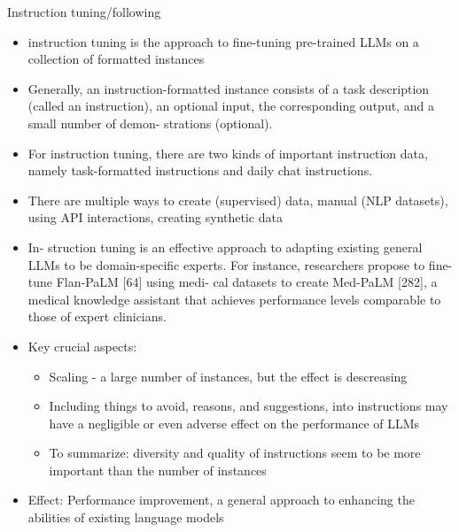 \documentclass[10pt]{beamer}
\begin{document}
\begin{frame}{Instruction tuning/following}

\begin{itemize}
\item instruction tuning is the approach to fine-tuning pre-trained LLMs on a collection of formatted instances
\item Generally, an instruction-formatted instance consists of a task description (called an instruction), an optional input, the corresponding output, and a small number of demon- strations (optional).
\item For instruction tuning, there are two kinds of important instruction data, namely task-formatted instructions and daily chat instructions.
\item There are multiple ways to create (supervised) data, manual (NLP datasets), using API interactions, creating synthetic data
\item In- struction tuning is an effective approach to adapting existing general LLMs to be domain-specific experts. For instance, researchers propose to fine-tune Flan-PaLM [64] using medi- cal datasets to create Med-PaLM [282], a medical knowledge assistant that achieves performance levels comparable to those of expert clinicians.
\item Key crucial aspects:
\begin{itemize}
\item Scaling - a large number of instances, but the effect is descreasing
\item Including things to avoid, reasons, and suggestions, into instructions may have a negligible or even adverse effect on the performance of LLMs
\item To summarize: diversity and quality of instructions seem to be more important than the number of instances
\end{itemize}
\item Effect: Performance improvement, a general approach to enhancing the abilities of existing language models
\end{itemize}

\end{frame}
\end{document}
